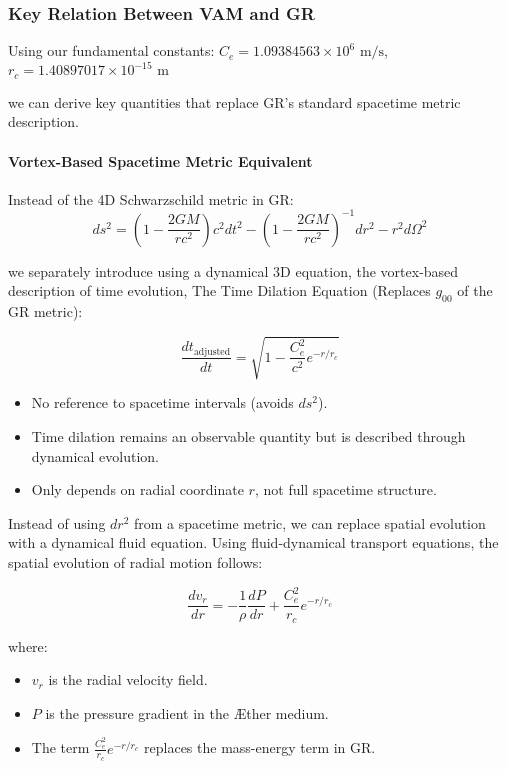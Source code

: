\subsubsection*{Key Relation Between VAM and GR}
Using our fundamental constants:
$C_e = 1.09384563 \times 10^6 \text{ m/s}$, $r_c = 1.40897017 \times 10^{-15} \text{ m}$

we can derive key quantities that replace GR's standard spacetime metric description.

\paragraph{Vortex-Based Spacetime Metric Equivalent}
Instead of the 4D Schwarzschild metric in GR:
\begin{equation*}
    ds^2 = \left( 1 - \frac{2GM}{rc^2} \right) c^2 dt^2 - \left( 1 - \frac{2GM}{rc^2} \right)^{-1} dr^2 - r^2 d\Omega^2
\end{equation*}

we separately introduce using a dynamical 3D equation, the vortex-based description of time evolution,
The Time Dilation Equation (Replaces $g_{00}$ of the GR metric):

\begin{equation*}
    \boxed{\frac{d t_{\text{adjusted}}}{d t} = \sqrt{1 - \frac{C_e^2}{c^2} e^{-r/r_c}}}
\end{equation*}


\begin{itemize}
\item No reference to spacetime intervals (avoids $ ds^2 $).
\item Time dilation remains an observable quantity but is described through dynamical evolution.
\item Only depends on radial coordinate $r$, not full spacetime structure.
\end{itemize}


Instead of using $ dr^2 $ from a spacetime metric, we can replace spatial evolution with a dynamical fluid equation. Using fluid-dynamical transport equations, the spatial evolution of radial motion follows:

\begin{equation*}
    \frac{d v_r}{d r} = - \frac{1}{\rho} \frac{d P}{d r} + \frac{C_e^2}{r_c} e^{-r/r_c}
\end{equation*}

where:

\begin{itemize}
\item $v_r$ is the radial velocity field.
\item $P$ is the pressure gradient in the Æther medium.
\item The term  $\frac{C_e^2}{r_c} e^{-r/r_c}$ replaces the mass-energy term in GR.
\end{itemize}

